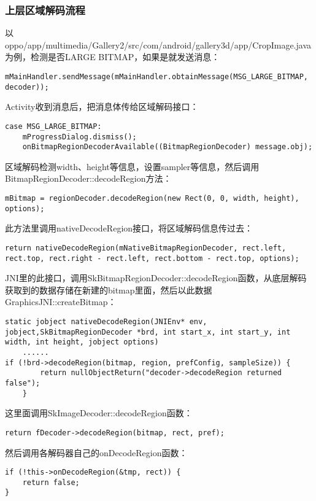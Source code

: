 \subsubsection{上层区域解码流程}
\label{sec:skia-region-from-app}
以oppo/app/multimedia/Gallery2/src/com/android/gallery3d/app/CropImage.java为例，检测是否LARGE BITMAP，如果是就发送消息：
\begin{lstlisting}[language={[ANSI]C}]
mMainHandler.sendMessage(mMainHandler.obtainMessage(MSG_LARGE_BITMAP, decoder));
\end{lstlisting}
Activity收到消息后，把消息体传给区域解码接口：
\begin{lstlisting}[language={[ANSI]C}]
case MSG_LARGE_BITMAP: 
    mProgressDialog.dismiss();
    onBitmapRegionDecoderAvailable((BitmapRegionDecoder) message.obj);
\end{lstlisting}
区域解码检测width、height等信息，设置sampler等信息，然后调用BitmapRegionDecoder::decodeRegion方法：
\begin{lstlisting}[language={[ANSI]C}]
mBitmap = regionDecoder.decodeRegion(new Rect(0, 0, width, height), options);
\end{lstlisting}
此方法里调用nativeDecodeRegion接口，将区域解码信息传过去：
\begin{lstlisting}[language={[ANSI]C}]
return nativeDecodeRegion(mNativeBitmapRegionDecoder, rect.left, rect.top, rect.right - rect.left, rect.bottom - rect.top, options);
\end{lstlisting}
JNI里的此接口，调用SkBitmapRegionDecoder::decodeRegion函数，从底层解码获取到的数据存储在新建的bitmap里面，然后以此数据GraphicsJNI::createBitmap：
\begin{lstlisting}[language={[ANSI]C}]
static jobject nativeDecodeRegion(JNIEnv* env, jobject,SkBitmapRegionDecoder *brd, int start_x, int start_y, int width, int height, jobject options)
    ......
if (!brd->decodeRegion(bitmap, region, prefConfig, sampleSize)) {
        return nullObjectReturn("decoder->decodeRegion returned false");
    }
\end{lstlisting}
这里面调用SkImageDecoder::decodeRegion函数：
\begin{lstlisting}[language={[ANSI]C}]
return fDecoder->decodeRegion(bitmap, rect, pref);
\end{lstlisting}
然后调用各解码器自己的onDecodeRegion函数：
\begin{lstlisting}[language={[ANSI]C}]
if (!this->onDecodeRegion(&tmp, rect)) {
    return false;
}
\end{lstlisting}

